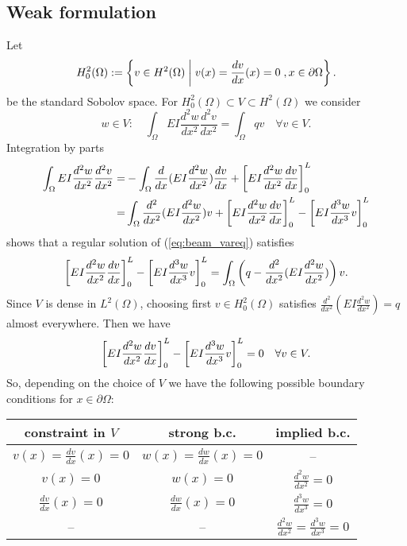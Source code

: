 \subsection{Weak formulation}\label{subsec:}
%
Let
%
\begin{equation}\label{eq:beam_V}
H^2_0(\Omega):= \left\{v\in H^2(\Omega)\;\middle|\;v(x)=\frac{d v}{dx}(x)=0\;,x\in\partial\Omega\right\}.
\end{equation}
%
be the standard Sobolov space.  
%
For $H^2_0(\Omega) \subset V\subset H^2(\Omega)$ we consider
%
\begin{equation}\label{eq:beam_vareq}
w\in V:\quad \int_{\Omega} EI \frac{d^2 w}{dx^2}\frac{d^2 v}{dx^2}= \int_{\Omega} qv \quad \forall v\in V.
\end{equation}
%
Integration by parts
%
\begin{align*}
\int_{\Omega} EI \frac{d^2 w}{dx^2}\frac{d^2 v}{dx^2}=&-\int_{\Omega}  \frac{d}{dx}(EI \frac{d^2 w}{dx^2})\frac{d v}{dx} + \left[{EI\frac{d^2 w}{dx^2}\frac{d v}{dx}}\right]_{0}^{L}\\
=& \int_{\Omega} \frac{d^2}{dx^2}(EI \frac{d^2 w}{dx^2})v + \left[{EI\frac{d^2 w}{dx^2}\frac{d v}{dx}}\right]_{0}^{L}- \left[{EI\frac{d^3 w}{dx^3}v}\right]_{0}^{L}
\end{align*}
%
shows that a regular solution of (\ref{eq:beam_vareq}) satisfies
%
\begin{align*}
\left[{EI\frac{d^2 w}{dx^2}\frac{d v}{dx}}\right]_{0}^{L}- \left[{EI\frac{d^3 w}{dx^3}v}\right]_{0}^{L} = 
\int_{\Omega} \left( q - \frac{d^2}{dx^2}(EI \frac{d^2 w}{dx^2})\right)v.
\end{align*}
%
Since $V$ is dense in $L^2(\Omega)$, choosing first $v\in H^2_0(\Omega)$ satisfies $\frac{d^2}{dx^2}(EI \frac{d^2 w}{dx^2})=q$ almost everywhere. Then we have
%
\begin{align*}
\left[{EI\frac{d^2 w}{dx^2}\frac{d v}{dx}}\right]_{0}^{L}- \left[{EI\frac{d^3 w}{dx^3}v}\right]_{0}^{L} = 0\quad \forall v\in V.
\end{align*}
%
So, depending on the choice of $V$ we have the following possible boundary conditions for $x\in\partial\Omega$:
\begin{center}
\begin{tabular}{c|c|c}
constraint in $V$& strong b.c. & implied b.c.\\\hline
$v(x)=\frac{dv}{dx}(x)=0$ & $w(x)=\frac{d w}{dx}(x)=0$ & --\\
$v(x)=0$ & $w(x)=0$ & $\frac{d^2 w}{dx^2}=0$\\
$\frac{dv}{dx}(x)=0$ & $\frac{dw}{dx}(x)=0$ & $\frac{d^3 w}{dx^3}=0$\\
-- & -- & $\frac{d^2 w}{dx^2}=\frac{d^3 w}{dx^3}=0$\\
\end{tabular}
\end{center}
